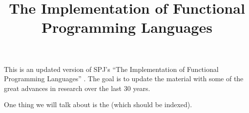 \documentclass{book}
\begin{document}
\title{The Implementation of Functional Programming Languages}

\maketitle


This is an updated version of SPJ's ``The Implementation of Functional
Programming Languages'' \citep{peyton1987implementation}. The goal is to update
the material with some of the great advances in research over the last 30
years.

One thing we will talk about is the  (which should be indexed).




\printindex
\end{document}
